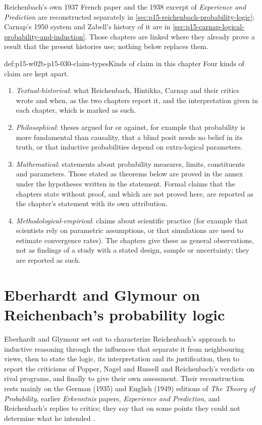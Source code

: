 Reichenbach's own 1937 French paper and the 1938 excerpt of
\emph{Experience and Prediction} are reconstructed separately in
\cref{sec:p15-reichenbach-probability-logic}; Carnap's 1950 system and
Zabell's history of it are in
\cref{sec:p15-carnap-logical-probability-and-induction}. Those chapters
are linked where they already prove a result that the present histories
use; nothing below replaces them.

\begin{hbconvention}{def:p15-w02b-p15-030-claim-types}{Kinds of claim in this chapter}
Four kinds of claim are kept apart.
\begin{enumerate}
\item \emph{Textual-historical}: what Reichenbach, Hintikka, Carnap and
  their critics wrote and when, as the two chapters report it, and the
  interpretation given in each chapter, which is marked as such.
\item \emph{Philosophical}: theses argued for or against, for example
  that probability is more fundamental than causality, that a blind
  posit needs no belief in its truth, or that inductive probabilities
  depend on extra-logical parameters.
\item \emph{Mathematical}: statements about probability measures,
  limits, constituents and parameters. Those stated as theorems below
  are proved in the annex under the hypotheses written in the statement.
  Formal claims that the chapters state without proof, and which are
  not proved here, are reported as the chapter's statement with its own
  attribution.
\item \emph{Methodological-empirical}: claims about scientific practice
  (for example that scientists rely on parametric assumptions, or that
  simulations are used to estimate convergence rates). The chapters give
  these as general observations, not as findings of a study with a
  stated design, sample or uncertainty; they are reported as such.
\end{enumerate}
\end{hbconvention}

\section{Eberhardt and Glymour on Reichenbach's probability logic}
\label{sec:p15-w02b-p15-030-eg}

Eberhardt and Glymour set out to characterize Reichenbach's approach to
inductive reasoning through the influences that separate it from
neighbouring views, then to state the logic, its interpretation and its
justification, then to report the criticisms of Popper, Nagel and
Russell and Reichenbach's verdicts on rival programs, and finally to
give their own assessment. Their reconstruction rests mainly on the
German (1935) and English (1949) editions of \emph{The Theory of
Probability}, earlier \emph{Erkenntnis} papers, \emph{Experience and
Prediction}, and Reichenbach's replies to critics; they say that on some
points they could not determine what he intended
\cite[pp.~357, 387]{EberhardtGlymour2011ReichenbachReading}.

